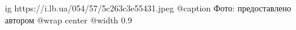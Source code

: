  
 
 
 
 

\ifcmt
  ig https://i.lb.ua/054/57/5c263c3e55431.jpeg
	@caption Фото: предоставлено автором
  @wrap center
  @width 0.9
\fi
